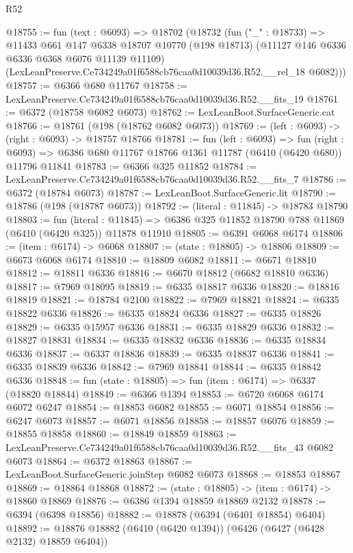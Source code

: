 \begin{lexlean}{R52}
\begin{coremodule}
@18755 := fun (text : @6093) =>
  @18702
    (@18732
      (fun ("_" : @18733) =>
      @11433
        @661
        @147
        @6338
        @18707
        @10770
        (@198 @18713)
        (@11127 @146 @6336 @6336 @6368 @6076 @11139 @11109)
        (LexLeanPreserve.Ce734249a01f6588cb76caa0d10039d36.R52.__rel_18 @6082)))
@18757 := @6366 @680 @11767
@18758 := LexLeanPreserve.Ce734249a01f6588cb76caa0d10039d36.R52.__fits_19
@18761 := @6372 (@18758 @6082 @6073)
@18762 := LexLeanBoot.SurfaceGeneric.cat
@18766 := @18761 (@198 (@18762 @6082 @6073))
@18769 := (left : @6093) -> (right : @6093) -> @18757 @18766
@18781 := fun (left : @6093) =>
  fun (right : @6093) => @6386 @680 @11767 @18766 @1361 @11787 (@6410 (@6420 @680)) @11796 @11841
@18783 := @6366 @325 @11852
@18784 := LexLeanPreserve.Ce734249a01f6588cb76caa0d10039d36.R52.__fits_7
@18786 := @6372 (@18784 @6073)
@18787 := LexLeanBoot.SurfaceGeneric.lit
@18790 := @18786 (@198 (@18787 @6073))
@18792 := (literal : @11845) -> @18783 @18790
@18803 := fun (literal : @11845) =>
  @6386 @325 @11852 @18790 @788 @11869 (@6410 (@6420 @325)) @11878 @11910
@18805 := @6391 @6068 @6174
@18806 := (item : @6174) -> @6068
@18807 := (state : @18805) -> @18806
@18809 := @6673 @6068 @6174
@18810 := @18809 @6082
@18811 := @6671 @18810
@18812 := @18811 @6336
@18816 := @6670 @18812 (@6682 @18810 @6336)
@18817 := @7969 @18095
@18819 := @6335 @18817 @6336
@18820 := @18816 @18819
@18821 := @18784 @2100
@18822 := @7969 @18821
@18824 := @6335 @18822 @6336
@18826 := @6335 @18824 @6336
@18827 := @6335 @18826
@18829 := @6335 @15957 @6336
@18831 := @6335 @18829 @6336
@18832 := @18827 @18831
@18834 := @6335 @18832 @6336
@18836 := @6335 @18834 @6336
@18837 := @6337 @18836
@18839 := @6335 @18837 @6336
@18841 := @6335 @18839 @6336
@18842 := @7969 @18841
@18844 := @6335 @18842 @6336
@18848 := fun (state : @18805) => fun (item : @6174) => @6337 (@18820 @18844)
@18849 := @6366 @1394
@18853 := @6720 @6068 @6174 @6072 @6247
@18854 := @18853 @6082
@18855 := @6071 @18854
@18856 := @6247 @6073
@18857 := @6071 @18856
@18858 := @18857 @6076
@18859 := @18855 @18858
@18860 := @18849 @18859
@18863 := LexLeanPreserve.Ce734249a01f6588cb76caa0d10039d36.R52.__fits_43 @6082 @6073
@18864 := @6372 @18863
@18867 := LexLeanBoot.SurfaceGeneric.joinStep @6082 @6073
@18868 := @18853 @18867
@18869 := @18864 @18868
@18872 := (state : @18805) -> (item : @6174) -> @18860 @18869
@18876 := @6386 @1394 @18859 @18869 @2132
@18878 := @6394 (@6398 @18856)
@18882 := @18878 (@6394 (@6401 @18854) @6404)
@18892 := @18876 @18882 (@6410 (@6420 @1394)) (@6426 (@6427 (@6428 @2132) @18859 @6404))

\end{coremodule}
\end{lexlean}
